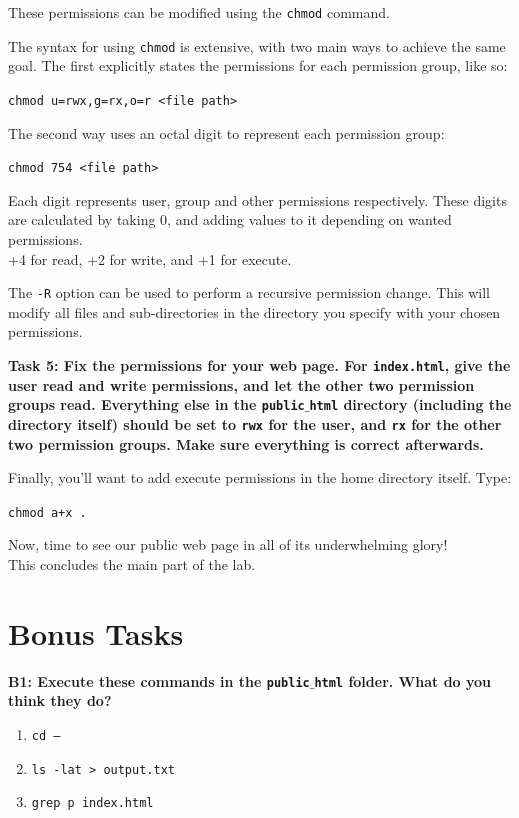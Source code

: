 \documentclass[a4paper,11pt,parskip=half-]{scrartcl}
\begin{document}
These permissions can be modified using the \texttt{chmod} command.

The syntax for using \texttt{chmod} is extensive, with two main ways to achieve the same goal. 
The first explicitly states the permissions for each permission group, like so:

\qquad \texttt{chmod u=rwx,g=rx,o=r <file path>}

The second way uses an octal digit to represent each permission group:

\qquad \texttt{chmod 754 <file path>} 

Each digit represents user, group and other permissions respectively. 
These digits are calculated by taking 0, and adding values to it depending on wanted permissions. \\
+4 for read, +2 for write, and +1 for execute.

The \texttt{-R} option can be used to perform a recursive permission change. 
This will modify all files and sub-directories in the directory you specify with your chosen permissions.

\bfseries Task 5: \normalfont 
Fix the permissions for your web page. 
For \texttt{index.html}, give the user read and write permissions, and let the other two permission groups read. 
Everything else in the \texttt{public$\_$html} directory (including the directory itself) should be set to \texttt{rwx} for the user, and \texttt{rx} for the other two permission groups. 
Make sure everything is correct afterwards.

Finally, you'll want to add execute permissions in the home directory itself. Type:

\qquad \texttt{chmod a+x .}

Now, time to see our public web page in all of its underwhelming glory! \\ 
This concludes the main part of the lab.

\section*{Bonus Tasks}

\bfseries B1: \normalfont 
Execute these commands in the \texttt{public$\_$html} folder. 
What do you think they do?

\begin{enumerate}
    \item \large \texttt{cd --} \normalsize
    \item \large \texttt{ls -lat > output.txt} \normalsize
    \item \large \texttt{grep p index.html} \normalsize
\end{enumerate}
\end{document}
